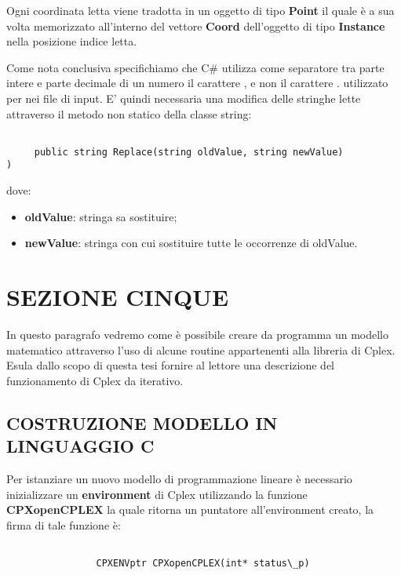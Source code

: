 \documentclass[11pt]{article}
\begin{document}
Ogni coordinata letta viene tradotta in un oggetto di tipo \textbf{Point} il quale è a sua volta memorizzato all'interno del vettore \textbf{Coord} dell'oggetto di tipo \textbf{Instance} nella posizione indice letta.

Come nota conclusiva specifichiamo che C\# utilizza come separatore tra parte intere e parte decimale di un numero il carattere , e non il carattere . utilizzato per nei file di input. E' quindi necessaria una modifica delle stringhe lette attraverso il metodo non statico della classe string:

\begin{lstlisting}

     public string Replace(string oldValue, string newValue)
)

\end{lstlisting}
dove:
\begin{itemize}
    \item \textbf{oldValue}: stringa sa sostituire;
    \item \textbf{newValue}: stringa con cui sostituire tutte le occorrenze di oldValue.
\end{itemize}

\section*{SEZIONE CINQUE}
\label{sec:SezioneCinqueS}

In questo paragrafo vedremo come è possibile creare da programma un modello matematico attraverso l'uso di alcune routine appartenenti alla libreria di Cplex. Esula dallo scopo di questa tesi fornire al lettore una descrizione del funzionamento di Cplex da iterativo.


\subsection*{COSTRUZIONE MODELLO IN LINGUAGGIO C}
\label{sec:ModelloCS}

Per istanziare un nuovo modello di programmazione lineare è necessario inizializzare un \textbf{environment} di Cplex utilizzando la funzione \textbf{CPXopenCPLEX} la quale ritorna un puntatore all'environment creato, la firma di tale funzione è:


\begin{lstlisting}

                CPXENVptr CPXopenCPLEX(int* status\_p)

\end{lstlisting}
\end{document}
